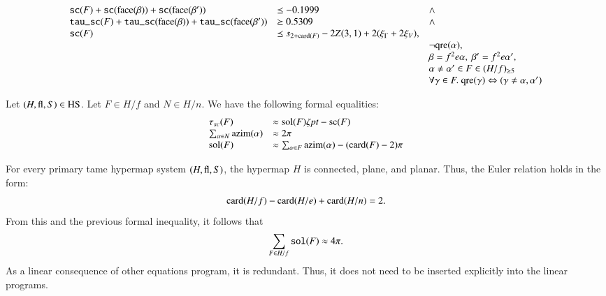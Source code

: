 \begin{equation}
    \begin{array}{lllll}
    {\operatorname{{\texttt{sc}}}}(F) + {\operatorname{{\texttt{sc}}}}({\operatorname{face}}(\beta)) +
    {\operatorname{{\texttt{sc}}}}({\operatorname{face}}(\beta')) &\preceq -0.1999&\wedge \\
    {\operatorname{{\texttt{tau\_sc}}}}(F) + {\operatorname{{\texttt{tau\_sc}}}}({\operatorname{face}}(\beta)) +
    {\operatorname{{\texttt{tau\_sc}}}}({\operatorname{face}}(\beta')) &\succeq 0.5309 &\wedge \\
    {\operatorname{{\texttt{sc}}}}(F) & \preceq s_{2+{\operatorname{card}}(F)} - 2 Z(3,1) + 2(\xi_\Gamma + 2\xi_V), \\
    &&\neg{\operatorname{qre}}(\alpha),\\
    &&\beta=f^2e\alpha,\ \beta'=f^2e\alpha',\\
    &&\alpha\ne\alpha'\in F\in (H/f)_{\ge5}\\
    &&\forall\gamma\in F.\ {\operatorname{qre}}(\gamma)\Leftrightarrow (\gamma\ne\alpha,\alpha')\\
    \end{array}
\end{equation}



Let $(H,{\operatorname{fl}},S)\in{\operatorname{HS}}$.   Let $F\in H/f$ and $N\in H/n$. We
have the following formal equalities:
\begin{equation}
    \begin{array}{lll}
    \tau_{sc}(F) &\approx \operatorname{sol}(F)\zeta\hbox{\it pt} - {\operatorname{sc}}(F)\\
    \sum_{\alpha\in N}{\operatorname{azim}}(\alpha) &\approx
    2\pi\\
    {\operatorname{sol}}(F) &\approx \sum_{\alpha\in F}{\operatorname{azim}}(\alpha) - ({\operatorname{card}}(F)
    - 2)\pi\\
    \end{array}
    \label{eqn:tau-sc}
\end{equation}


\begin{remark}  For every  primary tame hypermap system $(H,{\operatorname{fl}},S)$, the
hypermap $H$ is connected, plane, and planar.  Thus, the Euler
relation holds in the form:
    $$
    {\operatorname{card}}(H/f) - {\operatorname{card}}(H/e) + {\operatorname{card}}(H/n) = 2.
    $$
From this and the previous formal inequality, it follows that
    \begin{equation}
    \sum_{F\in H/f} {\operatorname{{\texttt{sol}}}}(F) \approx 4\pi.
    \end{equation}
As a linear consequence of other equations program, it is
redundant.  Thus, it does not need to be inserted explicitly into
the linear programs.
\end{remark}



